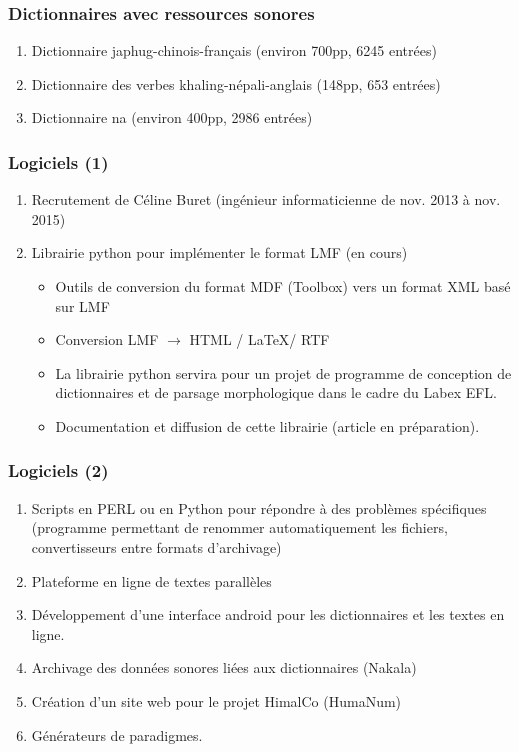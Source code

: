 \documentclass[xcolor=table]{beamer}
\begin{document}
 
  \begin{frame} 
 \frametitle{Dictionnaires avec ressources sonores}
 
\begin{enumerate}[<+->]
\item Dictionnaire japhug-chinois-français (environ 700pp, 6245 entrées)
\item  Dictionnaire des verbes khaling-népali-anglais (148pp, 653 entrées)
\item  Dictionnaire na (environ 400pp, 2986 entrées)
\end{enumerate}
 
  \end{frame}    
 
  \begin{frame} 
 \frametitle{Logiciels (1)}
 
\begin{enumerate}[<+->]
\item Recrutement de Céline Buret (ingénieur informaticienne de nov. 2013 à nov. 2015)
\item  Librairie python pour implémenter le format LMF (en cours)
\begin{itemize}
\item Outils de conversion du format MDF (Toolbox) vers un format XML basé sur LMF
\item Conversion LMF $\rightarrow$ HTML / \LaTeX / RTF
\item La librairie python servira pour un projet de programme de conception de dictionnaires et de parsage morphologique dans le cadre du Labex EFL.
\item Documentation et diffusion de cette librairie (article en préparation).
\end{itemize}
\end{enumerate}
  \end{frame}    
  
  \begin{frame} 
 \frametitle{Logiciels (2)}
 
\begin{enumerate}[<+->]
\item Scripts en PERL ou en Python pour répondre à des problèmes spécifiques (programme permettant de renommer automatiquement les fichiers, convertisseurs entre formats d'archivage)
\item Plateforme en ligne de textes parallèles
\item Développement d'une interface android pour les dictionnaires et les textes en ligne.
\item Archivage des données sonores liées aux dictionnaires (Nakala)
\item Création d'un site web pour le projet HimalCo (HumaNum)
\item Générateurs de paradigmes.
\end{enumerate}
 
  \end{frame}     
 
\end{document}

